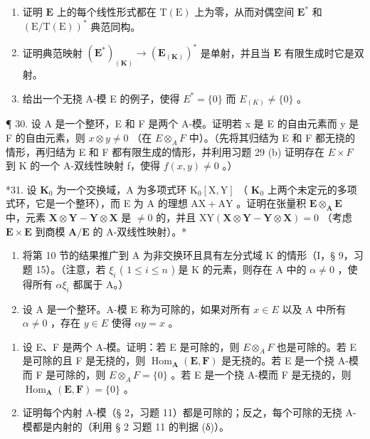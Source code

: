 \begin{enumerate}
\def\labelenumi{(\alph{enumi})}
\item
  证明 \(\mathbf{E}\) 上的每个线性形式都在 \(\mathrm{T}(\mathrm{E})\) 上为零，从而对偶空间 \(\mathbf{E}^*\) 和 \((\mathrm{E} / \mathrm{T}(\mathrm{E}))^*\) 典范同构。
\item
  证明典范映射 \((\mathbf{E}^{*})_{(\mathbf{K})}\to (\mathbf{E}_{(\mathbf{K})})^{*}\) 是单射，并且当 \(\mathbf{E}\) 有限生成时它是双射。
\item
  给出一个无挠 A-模 E 的例子，使得 \(E^{*} = \{0\}\) 而 \(E_{(K)} \neq \{0\}\) 。
\end{enumerate}

¶ 30. 设 A 是一个整环，E 和 F 是两个 A-模。证明若 x 是 E 的自由元素而 y 是 F 的自由元素，则 \(x \otimes y \neq 0\) （在 \(E \otimes_{A} F\) 中）。（先将其归结为 E 和 F 都无挠的情形，再归结为 E 和 F 都有限生成的情形，并利用习题 29 (b) 证明存在 \(E \times F\) 到 K 的一个 A-双线性映射 f，使得 \(f(x, y) \neq 0\) 。）

*31. 设 \(\mathbf{K}_0\) 为一个交换域，A 为多项式环 \(\mathrm{K}_0[\mathrm{X},\mathrm{Y}]\) （ \(\mathbf{K}_0\) 上两个未定元的多项式环，它是一个整环），而 E 为 A 的理想 \(\mathrm{AX} + \mathrm{AY}\) 。证明在张量积 \(\mathbf{E} \otimes_{\mathbf{A}} \mathbf{E}\) 中，元素 \(\mathbf{X} \otimes \mathbf{Y} - \mathbf{Y} \otimes \mathbf{X}\) 是 \(\neq 0\) 的，并且 \(\mathrm{XY}(\mathbf{X} \otimes \mathbf{Y} - \mathbf{Y} \otimes \mathbf{X}) = 0\) （考虑 \(\mathbf{E} \times \mathbf{E}\) 到商模 \(\mathbf{A}/\mathbf{E}\) 的 A-双线性映射）。*

\begin{enumerate}
\def\labelenumi{\arabic{enumi}.}
\setcounter{enumi}{31}
\item
  将第 10 节的结果推广到 A 为非交换环且具有左分式域 K 的情形（I，§ 9，习题 15）。（注意，若 \(\xi_{i}\) ( \(1 \leqslant i \leqslant n\) ) 是 K 的元素，则存在 A 中的 \(\alpha \neq 0\) ，使得所有 \(\alpha\xi_{i}\) 都属于 A。）
\item
  设 A 是一个整环。A-模 E 称为可除的，如果对所有 \(x \in E\) 以及 A 中所有 \(\alpha \neq 0\) ，存在 \(y \in E\) 使得 \(\alpha y = x\) 。
\end{enumerate}

\begin{enumerate}
\def\labelenumi{(\alph{enumi})}
\item
  设 E、F 是两个 A-模。证明：若 E 是可除的，则 \(E \otimes_{A} F\) 也是可除的。若 E 是可除的且 F 是无挠的，则 \(\operatorname{Hom}_{\mathbf{A}}(\mathbf{E}, \mathbf{F})\) 是无挠的。若 E 是一个挠 A-模而 F 是可除的，则 \(E \otimes_{A} F = \{0\}\) 。若 E 是一个挠 A-模而 F 是无挠的，则 \(\operatorname{Hom}_{\mathbf{A}}(\mathbf{E}, \mathbf{F}) = \{0\}\) 。
\item
  证明每个内射 A-模（§ 2，习题 11）都是可除的；反之，每个可除的无挠 A-模都是内射的（利用 § 2 习题 11 的判据 (δ)）。
\end{enumerate}

